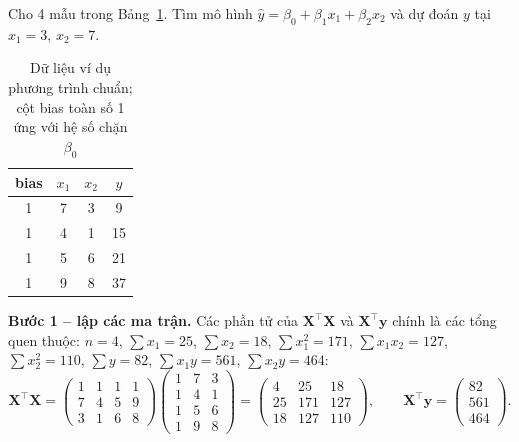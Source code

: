 \begin{example}
Cho 4 mẫu trong Bảng~\ref{tab:normal-eq}. Tìm mô hình $\hat{y} = \beta_0 + \beta_1 x_1 + \beta_2 x_2$ và dự đoán $y$ tại $x_1 = 3$, $x_2 = 7$.
\end{example}

\begin{table}[H]
\centering
\begin{tabular}{|c|c|c|c|}
\hline
\textbf{bias} & $x_1$ & $x_2$ & $y$ \\
\hline
1 & 7 & 3 & 9 \\ \hline
1 & 4 & 1 & 15 \\ \hline
1 & 5 & 6 & 21 \\ \hline
1 & 9 & 8 & 37 \\ \hline
\end{tabular}
\caption{Dữ liệu ví dụ phương trình chuẩn; cột bias toàn số 1 ứng với hệ số chặn $\beta_0$}
\label{tab:normal-eq}
\end{table}

\noindent\textbf{Bước 1 -- lập các ma trận.} Các phần tử của $\mathbf{X}^\top\mathbf{X}$ và $\mathbf{X}^\top\mathbf{y}$ chính là các tổng quen thuộc: $n = 4$, $\sum x_1 = 25$, $\sum x_2 = 18$, $\sum x_1^2 = 171$, $\sum x_1 x_2 = 127$, $\sum x_2^2 = 110$, $\sum y = 82$, $\sum x_1 y = 561$, $\sum x_2 y = 464$:
\[
    \mathbf{X}^\top\mathbf{X} =
    \begin{pmatrix} 1 & 1 & 1 & 1 \\ 7 & 4 & 5 & 9 \\ 3 & 1 & 6 & 8 \end{pmatrix}
    \begin{pmatrix} 1 & 7 & 3 \\ 1 & 4 & 1 \\ 1 & 5 & 6 \\ 1 & 9 & 8 \end{pmatrix}
    = \begin{pmatrix} 4 & 25 & 18 \\ 25 & 171 & 127 \\ 18 & 127 & 110 \end{pmatrix}, \qquad
    \mathbf{X}^\top\mathbf{y} = \begin{pmatrix} 82 \\ 561 \\ 464 \end{pmatrix}.
\]

